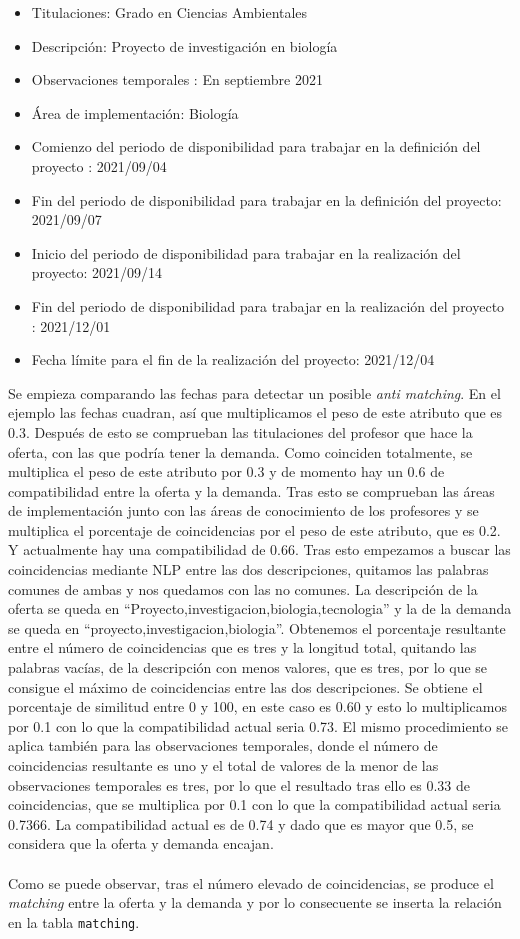 \documentclass[11pt]{book}
\begin{document}
\begin{itemize} 
	\item Titulaciones: Grado en Ciencias Ambientales
	\item Descripción: Proyecto de investigación en biología
	\item Observaciones temporales : En septiembre 2021
	\item Área de implementación: Biología
	\item Comienzo del periodo de disponibilidad para trabajar en la definición del
	proyecto : 2021/09/04
	\item Fin del periodo de disponibilidad para trabajar en la definición del
	proyecto: 2021/09/07
	\item Inicio del periodo de disponibilidad para trabajar en la realización del
	proyecto: 2021/09/14
	\item Fin del periodo de disponibilidad para trabajar en la realización del
	proyecto : 2021/12/01
	\item Fecha límite para el fin de la realización del proyecto: 2021/12/04
\end{itemize}
Se empieza comparando las fechas para detectar un posible \emph{anti matching}. En el ejemplo las fechas cuadran, así que multiplicamos el peso de este atributo que es 0.3. Después de esto se comprueban las titulaciones del profesor que hace la oferta, con las que podría tener la demanda. Como coinciden totalmente, se multiplica el peso de este atributo por 0.3 y de momento hay un 0.6 de compatibilidad entre la oferta y la demanda. Tras esto se comprueban las áreas de implementación junto con las áreas de conocimiento de los profesores y se multiplica el porcentaje de coincidencias por el peso de este atributo, que es 0.2. Y actualmente hay una compatibilidad de 0.66. Tras esto empezamos a buscar las coincidencias mediante NLP entre las dos descripciones, quitamos las palabras comunes de ambas y nos quedamos con las no comunes. La descripción de la oferta se queda en “Proyecto,investigacion,biologia,tecnologia” y la de la demanda se queda en “proyecto,investigacion,biologia”. Obtenemos el porcentaje resultante entre el número de coincidencias que es tres y la longitud total, quitando las palabras vacías, de la descripción con menos valores, que es tres, por lo que se consigue el máximo de coincidencias entre las dos descripciones. Se obtiene el porcentaje de similitud entre 0 y 100,  en este caso es 0.60 y esto lo multiplicamos por 0.1 con lo que la compatibilidad actual seria 0.73. El mismo procedimiento se aplica también para las observaciones temporales, donde el número de coincidencias resultante es uno y el total de valores de la menor de las observaciones temporales es tres, por lo que el resultado tras ello es 0.33 de coincidencias, que se multiplica por 0.1 con lo que la compatibilidad actual seria 0.7366. La compatibilidad actual es de 0.74 y dado que es mayor que 0.5, se considera que la oferta y demanda encajan.\\\\
 Como se puede observar, tras el número elevado de coincidencias, se produce el \emph{matching} entre la oferta y la demanda y por lo consecuente se inserta la relación en la tabla \texttt{matching}.\\\\
\end{document}
